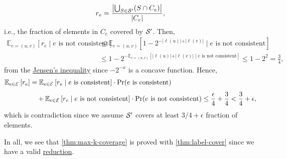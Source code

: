 \begin{enumerate}[(a)]
\begin{explanation}
		      \[
			      r_e = \frac{\left\vert \bigcup_{S\in \mathcal{\MakeUppercase{s}} ^\prime } (S \cap C_e) \right\vert}{\vert C_e \vert},
		      \]
		      i.e., the fraction of elements in \(C_e\) covered by \(\mathcal{\MakeUppercase{S}} ^\prime \). Then,
		      \[
			      \begin{split}
				      \mathbb{E}_{e=(u, v)}\left[r_e \mid e \text{ is not consistent} \right]
				      &\leq \mathbb{E}_{e=(u, v)}\left[1 - 2^{-\vert \ell (u) \vert + \vert \ell (v) \vert } \mid e \text{ is not consistent} \right]\\
				      &\leq 1 - 2^{-\mathbb{E}_{e=(u, v)}\left[\vert \ell (u) \vert + \vert \ell (v) \vert \mid e \text{ is not consistent} \right]}
				      \leq 1 - 2^{2} = \frac{3}{4},
			      \end{split}
		      \]
		      from the \href{https://en.wikipedia.org/wiki/Jensen's_inequality}{Jensen's inequality} since \(-2^{-x}\) is a concave function. Hence,
		      \[
			      \begin{split}
				      \mathbb{E}_{e\in \mathcal{\MakeUppercase{e}} }\left[r_e \right]
				      &= \mathbb{E}_{e\in \mathcal{\MakeUppercase{e}} }\left[ r_e \mid e\text{ is consistent} \right] \cdot \Pr_{}(e\text{ is consistent}) \\
				      &\quad + \mathbb{E}_{e\in \mathcal{\MakeUppercase{e}} }\left[ r_e \mid e\text{ is not consistent} \right] \cdot \Pr_{}(e\text{ is not consistent})
				      \leq \frac{\epsilon}{4} + \frac{3}{4} < \frac{3}{4} + \epsilon,
			      \end{split}
		      \]
		      which is contradiction since we assume \(\mathcal{\MakeUppercase{s}} ^\prime \) covers at least \(3 / 4 + \epsilon \) fraction of elements.
	      \end{explanation}
\end{enumerate}

In all, we see that \autoref{thm:max-k-coverage} is proved with \autoref{thm:label-cover} since we have a valid \hyperref[def:reduction]{reduction}.